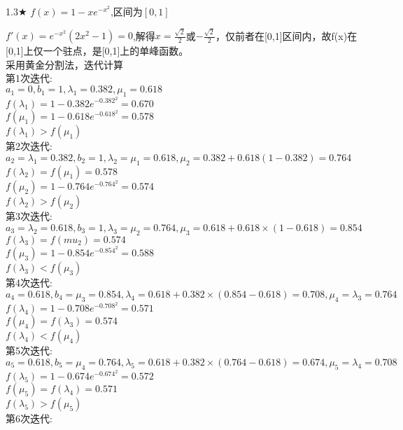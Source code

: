 \begin{problem}{1.3$\bigstar$}
    $f(x)=1-xe^{-x^2}$,区间为$[0,1]$
\end{problem}
\begin{solution}
    $f'(x)=e^{-x^2}(2x^2-1)=0$,解得$x=\frac{\sqrt{2}}{2}$或$-\frac{\sqrt{2}}{2}$，仅前者在[0,1]区间内，故f(x)在[0,1]上仅一个驻点，是[0,1]上的单峰函数。\\
    采用黄金分割法，迭代计算\\
    第1次迭代:\\
    $a_1=0,b_1=1,\lambda_1=0.382,\mu_1=0.618$\\
    $f(\lambda_1)=1-0.382e^{-0.382^2}=0.670$\\
    $f(\mu_1)=1-0.618e^{-0.618^2}=0.578$\\
    $f(\lambda_1)>f(\mu_1)$\\
    第2次迭代:\\
    $a_2=\lambda_1=0.382,b_2=1,\lambda_2=\mu_1=0.618,\mu_2=0.382+0.618(1-0.382)=0.764$\\
    $f(\lambda_2)=f(\mu_1)=0.578$\\
    $f(\mu_2)=1-0.764e^{-0.764^2}=0.574$\\
    $f(\lambda_2)>f(\mu_2)$\\
    第3次迭代:\\
    $a_3=\lambda_2=0.618,b_3=1,\lambda_3=\mu_2=0.764,\mu_3=0.618+0.618\times(1-0.618)=0.854$\\
    $f(\lambda_3)=f(mu_2)=0.574$\\
    $f(\mu_3)=1-0.854e^{-0.854^2}=0.588$\\
    $f(\lambda_3)<f(\mu_3)$\\
    第4次迭代:\\
    $a_4=0.618,b_4=\mu_3=0.854,\lambda_4=0.618+0.382\times(0.854-0.618)=0.708,\mu_4=\lambda_3=0.764$\\
    $f(\lambda_4)=1-0.708e^{-0.708^2}=0.571$\\
    $f(\mu_4)=f(\lambda_3)=0.574$\\
    $f(\lambda_4)<f(\mu_4)$\\
    第5次迭代:\\
    $a_5=0.618,b_5=\mu_4=0.764,\lambda_5=0.618+0.382\times(0.764-0.618)=0.674,\mu_5=\lambda_4=0.708$\\
    $f(\lambda_5)=1-0.674e^{-0.674^2}=0.572$\\
    $f(\mu_5)=f(\lambda_4)=0.571$\\
    $f(\lambda_5)>f(\mu_5)$\\
    第6次迭代:\\

\end{solution}
